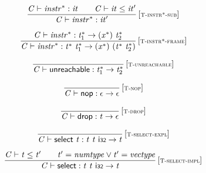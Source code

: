 $$
\begin{array}{@{}c@{}}\displaystyle
\frac{
{\mathit{C}} \vdash {{\mathit{instr}}^\ast} : {\mathit{it}}
 \qquad
{\mathit{C}} \vdash {\mathit{it}} \leq {\mathit{it}'}
}{
{\mathit{C}} \vdash {{\mathit{instr}}^\ast} : {\mathit{it}'}
} \, {[\textsc{\scriptsize T{-}instr*{-}sub}]}
\qquad
\end{array}
$$

$$
\begin{array}{@{}c@{}}\displaystyle
\frac{
{\mathit{C}} \vdash {{\mathit{instr}}^\ast} : {{\mathit{t}}_{{1}}^\ast} \rightarrow ({{\mathit{x}}^\ast})~{{\mathit{t}}_{{2}}^\ast}
}{
{\mathit{C}} \vdash {{\mathit{instr}}^\ast} : {{\mathit{t}}^\ast}~{{\mathit{t}}_{{1}}^\ast} \rightarrow ({{\mathit{x}}^\ast})~({{\mathit{t}}^\ast}~{{\mathit{t}}_{{2}}^\ast})
} \, {[\textsc{\scriptsize T{-}instr*{-}frame}]}
\qquad
\end{array}
$$

\vspace{1ex}

$$
\begin{array}{@{}c@{}}\displaystyle
\frac{
}{
{\mathit{C}} \vdash \mathsf{unreachable} : {{\mathit{t}}_{{1}}^\ast} \rightarrow {{\mathit{t}}_{{2}}^\ast}
} \, {[\textsc{\scriptsize T{-}unreachable}]}
\qquad
\end{array}
$$

$$
\begin{array}{@{}c@{}}\displaystyle
\frac{
}{
{\mathit{C}} \vdash \mathsf{nop} : \epsilon \rightarrow \epsilon
} \, {[\textsc{\scriptsize T{-}nop}]}
\qquad
\end{array}
$$

$$
\begin{array}{@{}c@{}}\displaystyle
\frac{
}{
{\mathit{C}} \vdash \mathsf{drop} : {\mathit{t}} \rightarrow \epsilon
} \, {[\textsc{\scriptsize T{-}drop}]}
\qquad
\end{array}
$$

\vspace{1ex}

$$
\begin{array}{@{}c@{}}\displaystyle
\frac{
}{
{\mathit{C}} \vdash \mathsf{select}~{\mathit{t}} : {\mathit{t}}~{\mathit{t}}~\mathsf{i{\scriptstyle32}} \rightarrow {\mathit{t}}
} \, {[\textsc{\scriptsize T{-}select{-}expl}]}
\qquad
\end{array}
$$

$$
\begin{array}{@{}c@{}}\displaystyle
\frac{
{\mathit{C}} \vdash {\mathit{t}} \leq {\mathit{t}'}
 \qquad
{\mathit{t}'} = {\mathit{numtype}} \lor {\mathit{t}'} = {\mathit{vectype}}
}{
{\mathit{C}} \vdash \mathsf{select} : {\mathit{t}}~{\mathit{t}}~\mathsf{i{\scriptstyle32}} \rightarrow {\mathit{t}}
} \, {[\textsc{\scriptsize T{-}select{-}impl}]}
\qquad
\end{array}
$$

